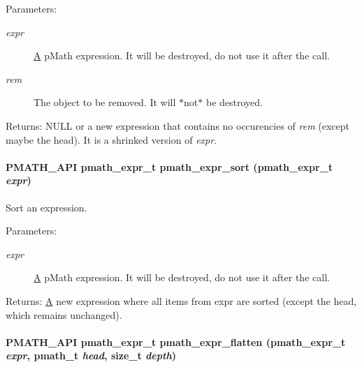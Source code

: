 \begin{Desc}
\item[Parameters:]
\begin{description}
\item[{\em expr}]\hyperlink{class_a}{A} pMath expression. It will be destroyed, do not use it after the call. \item[{\em rem}]The object to be removed. It will $\ast$not$\ast$ be destroyed. \end{description}
\end{Desc}
\begin{Desc}
\item[Returns:]NULL or a new expression that contains no occurencies of {\em rem\/} (except maybe the head). It is a shrinked version of {\em expr\/}. \end{Desc}
\hypertarget{group__expressions_gb3708a99c95943b062a91797d340dd7b}{
\paragraph[{pmath\_\-expr\_\-sort}]{\setlength{\rightskip}{0pt plus 5cm}PMATH\_\-API {\bf pmath\_\-expr\_\-t} pmath\_\-expr\_\-sort ({\bf pmath\_\-expr\_\-t} {\em expr})}\hfill}
\label{group__expressions_gb3708a99c95943b062a91797d340dd7b}


Sort an expression. 

\begin{Desc}
\item[Parameters:]
\begin{description}
\item[{\em expr}]\hyperlink{class_a}{A} pMath expression. It will be destroyed, do not use it after the call. \end{description}
\end{Desc}
\begin{Desc}
\item[Returns:]\hyperlink{class_a}{A} new expression where all items from expr are sorted (except the head, which remains unchanged). \end{Desc}
\hypertarget{group__expressions_g9162f7fe8a42627c5adf6185dba9e67d}{
\paragraph[{pmath\_\-expr\_\-flatten}]{\setlength{\rightskip}{0pt plus 5cm}PMATH\_\-API {\bf pmath\_\-expr\_\-t} pmath\_\-expr\_\-flatten ({\bf pmath\_\-expr\_\-t} {\em expr}, \/  {\bf pmath\_\-t} {\em head}, \/  size\_\-t {\em depth})}\hfill}
\label{group__expressions_g9162f7fe8a42627c5adf6185dba9e67d}


